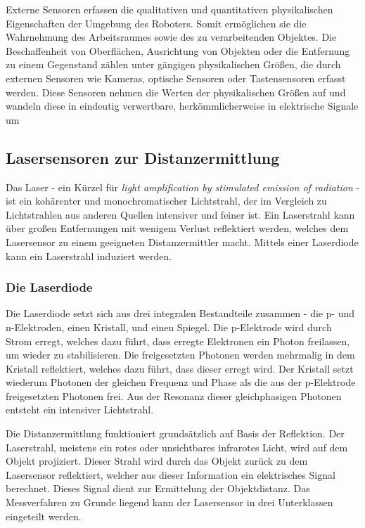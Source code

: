 Externe Sensoren erfassen die qualitativen und quantitativen physikalischen Eigenschaften der Umgebung des Roboters. Somit ermöglichen sie die Wahrnehmung des Arbeitsraumes sowie des zu verarbeitenden Objektes. Die Beschaffenheit von Oberflächen, Ausrichtung von Objekten oder die Entfernung zu einem Gegenstand zählen unter gängigen physikalischen Größen, die durch externen Sensoren wie Kameras, optische Sensoren oder Tastensensoren erfasst werden. Diese Sensoren nehmen die Werten der physikalischen Größen auf und wandeln diese in eindeutig verwertbare, herkömmlicherweise in elektrische Signale um\autocite[221]{maier2022grundlagen}

\subsection{Lasersensoren zur Distanzermittlung} \label{ssec:lasersensoren}
Das Laser - ein Kürzel für \emph{light amplification by stimulated emission of radiation} - ist ein kohärenter und monochromatischer Lichtstrahl, der im Vergleich zu Lichtstrahlen aus anderen Quellen intensiver und feiner ist. Ein Laserstrahl kann über großen Entfernungen mit wenigem Verlust reflektiert werden, welches dem Lasersensor zu einem geeigneten Distanzermittler macht. Mittels einer Laserdiode kann ein Laserstrahl induziert werden. \autocite[126]{HesseStefan2018SFDP}

\subsubsection{Die Laserdiode}
Die Laserdiode setzt sich aus drei integralen Bestandteile zusammen - die p- und n-Elektroden, einen Kristall, und einen Spiegel. Die p-Elektrode wird durch Strom erregt, welches dazu führt, dass erregte Elektronen ein Photon freilassen, um wieder zu stabilisieren. Die freigesetzten Photonen werden mehrmalig in dem Kristall reflektiert, welches dazu führt, dass dieser erregt wird. Der Kristall setzt wiederum Photonen der gleichen Frequenz und Phase als die aus der p-Elektrode freigesetzten Photonen frei. Aus der Resonanz dieser gleichphasigen Photonen entsteht ein intensiver Lichtstrahl. \autocite[4-5]{PeterWEpperlein20013} \autocite[16-21]{Hooshang2004} \autocite[221-232]{DomingoGeorge2007}

Die Distanzermittlung funktioniert grundsätzlich auf Basis der Reflektion. Der Laserstrahl, meistens ein rotes oder unsichtbares infrarotes Licht, wird auf dem Objekt projiziert. Dieser Strahl wird durch das Objekt zurück zu dem Lasersensor reflektiert, welcher aus dieser Information ein elektrisches Signal berechnet. Dieses Signal dient zur Ermittelung der Objektdistanz. Das Messverfahren zu Grunde liegend kann der Lasersensor in drei Unterklassen eingeteilt werden.\autocite[167]{Hering2018}

